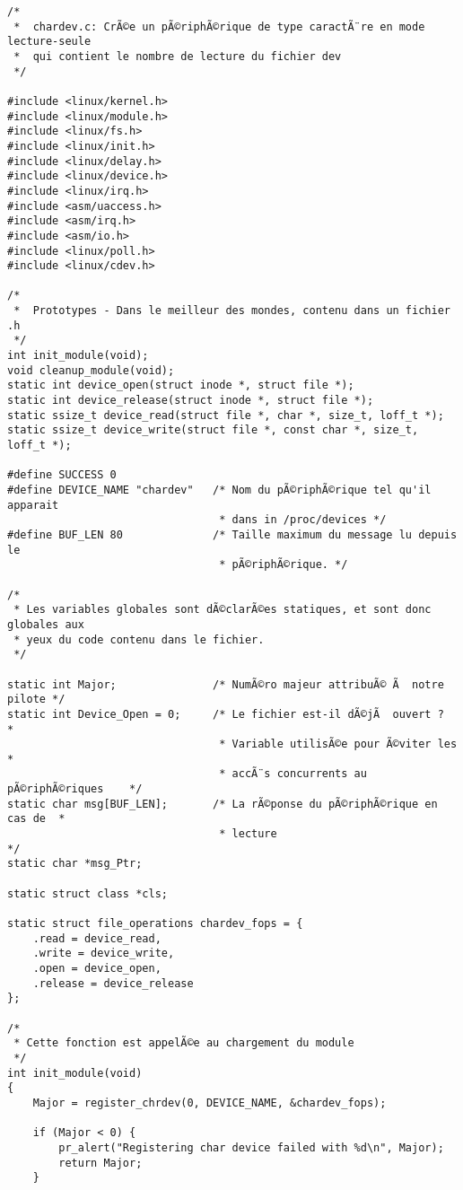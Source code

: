 \documentclass[11pt]{article}
\begin{document}
\begin{verbatim}
/*
 *  chardev.c: CrÃ©e un pÃ©riphÃ©rique de type caractÃ¨re en mode lecture-seule
 *  qui contient le nombre de lecture du fichier dev
 */

#include <linux/kernel.h>
#include <linux/module.h>
#include <linux/fs.h>
#include <linux/init.h>
#include <linux/delay.h>
#include <linux/device.h>
#include <linux/irq.h>
#include <asm/uaccess.h>
#include <asm/irq.h>
#include <asm/io.h>
#include <linux/poll.h>
#include <linux/cdev.h>

/*
 *  Prototypes - Dans le meilleur des mondes, contenu dans un fichier .h
 */
int init_module(void);
void cleanup_module(void);
static int device_open(struct inode *, struct file *);
static int device_release(struct inode *, struct file *);
static ssize_t device_read(struct file *, char *, size_t, loff_t *);
static ssize_t device_write(struct file *, const char *, size_t, loff_t *);

#define SUCCESS 0
#define DEVICE_NAME "chardev"   /* Nom du pÃ©riphÃ©rique tel qu'il apparait
                                 * dans in /proc/devices */
#define BUF_LEN 80              /* Taille maximum du message lu depuis le
                                 * pÃ©riphÃ©rique. */

/*
 * Les variables globales sont dÃ©clarÃ©es statiques, et sont donc globales aux
 * yeux du code contenu dans le fichier.
 */

static int Major;               /* NumÃ©ro majeur attribuÃ© Ã  notre pilote */
static int Device_Open = 0;     /* Le fichier est-il dÃ©jÃ  ouvert ?       *
                                 * Variable utilisÃ©e pour Ã©viter les     *
                                 * accÃ¨s concurrents au pÃ©riphÃ©riques    */
static char msg[BUF_LEN];       /* La rÃ©ponse du pÃ©riphÃ©rique en cas de  *
                                 * lecture                               */
static char *msg_Ptr;

static struct class *cls;

static struct file_operations chardev_fops = {
    .read = device_read,
    .write = device_write,
    .open = device_open,
    .release = device_release
};

/*
 * Cette fonction est appelÃ©e au chargement du module
 */
int init_module(void)
{
    Major = register_chrdev(0, DEVICE_NAME, &chardev_fops);

    if (Major < 0) {
        pr_alert("Registering char device failed with %d\n", Major);
        return Major;
    }


\end{verbatim}
\end{document}
